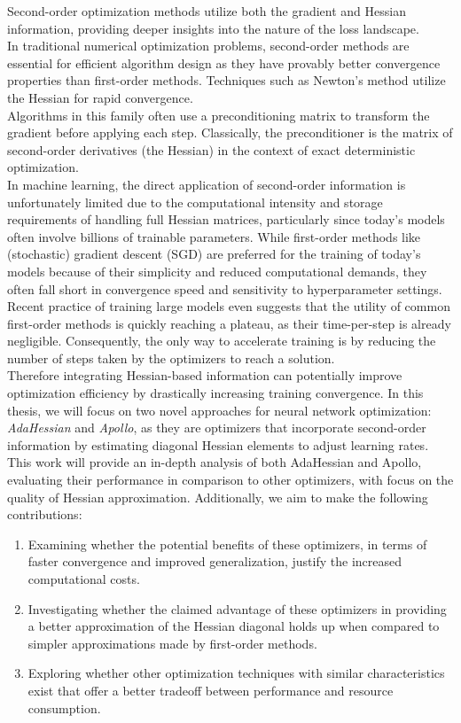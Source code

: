 Second-order optimization methods utilize both the gradient and Hessian information,
providing deeper insights into the nature of the loss landscape. \\
In traditional numerical optimization problems, second-order methods are essential for efficient algorithm design as they
have provably better convergence properties than first-order methods.
Techniques such as Newton's method utilize the Hessian for rapid convergence.\\
Algorithms in this family often use a preconditioning matrix to transform the gradient before applying each step.
Classically, the preconditioner is the matrix of second-order derivatives (the Hessian) in the context of
exact deterministic optimization.\cite{anil2021scalable}\\
In machine learning, the direct application of second-order information is unfortunately limited due to the computational 
intensity and storage requirements of handling full Hessian matrices,
particularly since today's models often involve billions of trainable parameters.
While first-order methods like (stochastic) gradient descent (SGD) are preferred for the training of today's models
because of their simplicity and reduced computational demands,
they often fall short in convergence speed and sensitivity to hyperparameter settings.\\ 
Recent practice of training large models even suggests
that the utility of common first-order methods is quickly reaching a plateau, as their time-per-step is already negligible.
Consequently, the only way to accelerate training is by reducing the number of steps taken by the optimizers to reach a solution.\cite{anil2021scalable}\\
Therefore integrating Hessian-based information can potentially improve optimization efficiency by drastically increasing training convergence.
In this thesis, we will focus on two novel approaches for neural network optimization: \emph{AdaHessian} \cite{yao2021adahessian} and \emph{Apollo},
as they are optimizers that incorporate second-order information by estimating diagonal Hessian elements to adjust learning rates.
This work will provide an in-depth analysis of both AdaHessian and Apollo, evaluating their performance in comparison to other optimizers, with focus on the quality of Hessian approximation.
Additionally, we aim to make the following contributions:
\begin{enumerate}
    \item Examining whether the potential benefits of these optimizers, in terms of faster convergence and improved generalization, justify the increased computational costs.
    \item Investigating whether the claimed advantage of these optimizers in providing a better approximation of the Hessian diagonal holds up when compared to simpler approximations made by first-order methods.
    \item Exploring whether other optimization techniques with similar characteristics exist that offer a better tradeoff between performance and resource consumption.
\end{enumerate}

\vfill

\endgroup

\vfill
